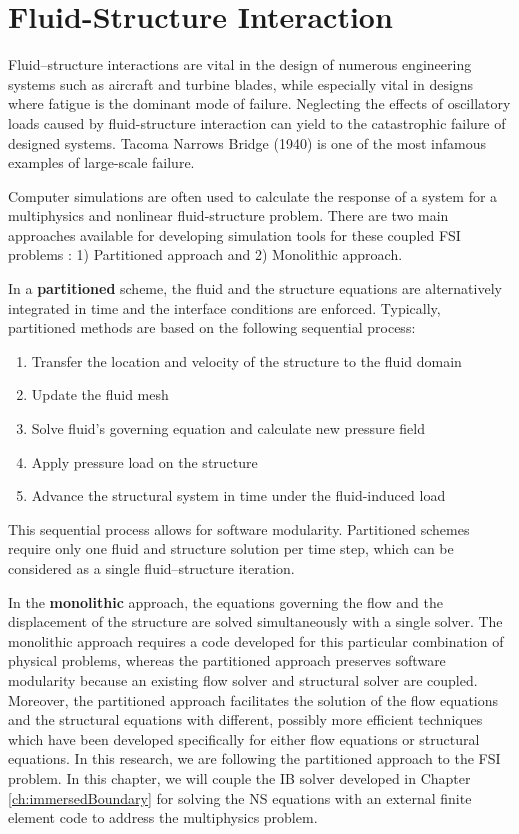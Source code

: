 \section{Fluid-Structure Interaction}
Fluid–structure interactions are vital in the design of numerous engineering systems such as aircraft and turbine blades, while especially vital in designs where fatigue is the dominant mode of failure. Neglecting the effects of oscillatory loads caused by fluid-structure interaction can yield to the catastrophic failure of designed systems. Tacoma Narrows Bridge (1940) is one of the most infamous examples of large-scale failure.

Computer simulations are often used to calculate the response of a system for a multiphysics and nonlinear fluid-structure problem. There are two main approaches available for developing simulation tools for these coupled FSI problems \cite{michler2004monolithic}: 1) Partitioned approach and 2) Monolithic approach.

In a \textbf{partitioned} scheme, the fluid and the structure equations are alternatively integrated in
time and the interface conditions are enforced. Typically, partitioned methods are based on the following sequential process:

\begin{enumerate}
	\item Transfer the location and velocity of the structure to the fluid domain
	\item Update the fluid mesh
	\item Solve fluid's governing equation and calculate new pressure field
	\item Apply pressure load on the structure
	\item Advance the structural system in time under the fluid-induced load
\end{enumerate}

This sequential process allows for software modularity. Partitioned schemes require only one fluid
and structure solution per time step, which can be considered as a single fluid–structure iteration.

In the \textbf{monolithic} approach, the equations governing the flow and the displacement of the structure are solved simultaneously with a single solver. The monolithic approach requires a code developed for this particular combination of physical problems, whereas the partitioned approach preserves software modularity because an existing flow solver and structural solver are coupled. Moreover, the partitioned approach facilitates the solution of the flow equations and the structural equations with different, possibly more efficient techniques which have been developed specifically for either flow equations or structural equations. In this research, we are following the partitioned approach to the FSI problem. In this chapter, we will couple the IB solver developed in Chapter \ref{ch:immersedBoundary} for solving the NS equations with an external finite element code to address the multiphysics problem.

